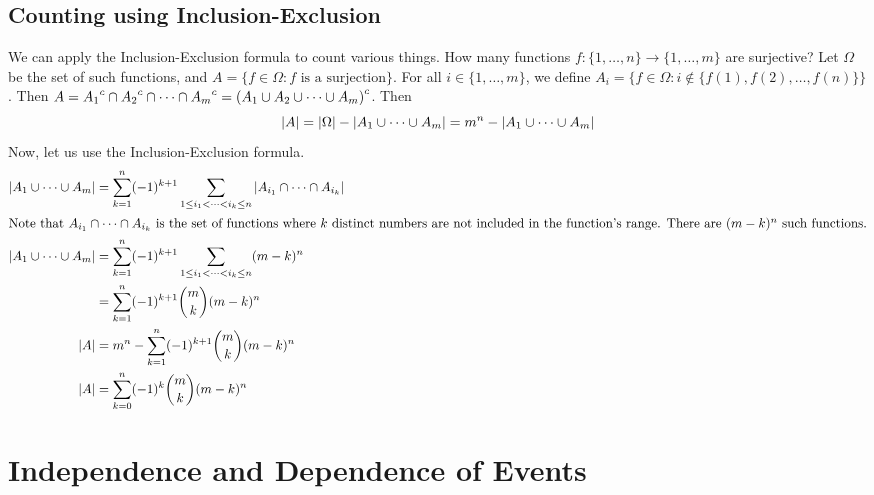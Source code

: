 \documentclass{article}
\begin{document}
\subsection{Counting using Inclusion-Exclusion}
We can apply the Inclusion-Exclusion formula to count various things. How many functions $f \colon \{ 1, \dots, n \} \to \{ 1, \dots, m \}$ are surjective? Let $\Omega$ be the set of such functions, and $A = \{ f \in \Omega : f \text{ is a surjection} \}$. For all $i \in \{ 1, \dots, m \}$, we define $A_i = \{ f \in \Omega : i \notin \{ f(1), f(2), \dots, f(n) \} \}$. Then $A = {A_1}^c \cap {A_2}^c \cap \dots \cap {A_m}^c = {(A_1 \cup A_2 \cup \dots \cup A_m)}^c$. Then
\[ \abs{A} = \abs{\Omega} - \abs{A_1 \cup \dots \cup A_m} = m^n - \abs{A_1 \cup \dots \cup A_m} \]
Now, let us use the Inclusion-Exclusion formula.
\begin{align*}
	\abs{A_1 \cup \dots \cup A_m} & = \sum_{k=1}^n (-1)^{k+1} \sum_{1 \leq i_1 < \dots < i_k \leq n} \abs{A_{i_1} \cap \dots \cap A_{i_k}} \\
	\intertext{Note that $A_{i_1} \cap \dots \cap A_{i_k}$ is the set of functions where $k$ distinct numbers are not included in the function's range. There are $(m-k)^n$ such functions.}
	\abs{A_1 \cup \dots \cup A_m} & = \sum_{k=1}^n (-1)^{k+1} \sum_{1 \leq i_1 < \dots < i_k \leq n} (m-k)^n                               \\
	                              & = \sum_{k=1}^n (-1)^{k+1} \binom{m}{k} (m-k)^n                                                         \\
	\abs{A}                       & = m^n -  \sum_{k=1}^n (-1)^{k+1} \binom{m}{k} (m-k)^n                                                  \\
	\abs{A}                       & = \sum_{k=0}^n (-1)^k \binom{m}{k} (m-k)^n
\end{align*}

\section{Independence and Dependence of Events}
\end{document}
